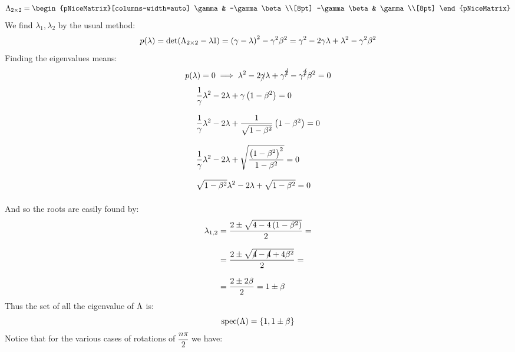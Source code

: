 \begin{equation}
  \lm_{2 \by 2} = \begin{pNiceMatrix}[columns-width=auto]
    \gamma & -\gamma \beta \\[8pt]
    -\gamma \beta & \gamma \\[8pt]
  \end{pNiceMatrix}
\end{equation}
We find $\lambda_1, \lambda_2$ by the usual method:
\begin{equation}
  p(\lambda) = \det(\Lambda_{2 \times 2} - \lambda \mathbb{I}) = \left(\gamma - \lambda\right)^2 - \gamma^2\beta^2 = \gamma^2 -2\gamma\lambda +\lambda^2 - \gamma^2\beta^2
\end{equation}
Finding the eigenvalues means:
\begin{equation}
  p(\lambda) = 0 \implies \lambda^2 -2\cancel{\gamma}\lambda + \gamma^{\cancel{2}}- \gamma^{\cancel{2}}\beta^2 = 0 \\[8pt]
\end{equation}
\begin{equation}
  \begin{split}
    &\dfrac{1}{\gamma}\lambda^2 -2\lambda +\gamma \left(1- \beta^2\right) = 0 \\[8pt]
    &\dfrac{1}{\gamma}\lambda^2 -2\lambda + \dfrac{1}{\sqrt{1-\beta^2}} \left(1- \beta^2\right) = 0 \\[8pt]
    &\dfrac{1}{\gamma}\lambda^2 -2\lambda + \sqrt{\dfrac{\left(1- \beta^2\right)^2}{1-\beta^2}}  = 0 \\[8pt]
    &\sqrt{1- \beta^2}\lambda^2 -2\lambda + \sqrt{1- \beta^2}  = 0 \\[8pt]
  \end{split}
\end{equation}
And so the roots are easily found by:
\begin{equation}
  \begin{split}
    \lambda_{1,2} &= \dfrac{2\pm\sqrt{4 - 4\left(1-\beta^2\right)}}{2} =\\[8pt]
    & = \dfrac{2\pm\sqrt{\cancel{4} - \cancel{4} +4\beta^2}}{2} =\\[8pt]
    & = \dfrac{2 \pm 2\beta}{2} = 1 \pm \beta
  \end{split}
\end{equation}
Thus the set of all the eigenvalue of $\Lambda$ is:
\begin{equation}
  \mathrm{spec}(\Lambda) = \{1, 1 \pm \beta\}
\end{equation}
Notice that for the various cases of rotations of $\dfrac{n\pi}{2}$ we have:
